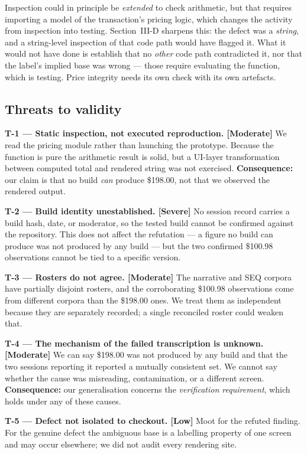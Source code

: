 \documentclass[conference]{IEEEtran}
\begin{document}
Inspection could in principle be \emph{extended} to check arithmetic, but that requires importing a
model of the transaction's pricing logic, which changes the activity from inspection into testing.
Section~III-D sharpens this: the defect was a \emph{string}, and a string-level inspection of that code
path would have flagged it. What it would not have done is establish that no \emph{other} code path
contradicted it, nor that the label's implied base was wrong --- those require evaluating the function,
which is testing. Price integrity needs its own check with its own artefacts.

\subsection{Threats to validity}

\textbf{T-1 --- Static inspection, not executed reproduction. [Moderate]} We read the pricing module
rather than launching the prototype. Because the function is pure the arithmetic result is solid, but a
UI-layer transformation between computed total and rendered string was not exercised.
\textbf{Consequence:} our claim is that no build \emph{can} produce \$198.00, not that we observed the
rendered output.

\textbf{T-2 --- Build identity unestablished. [Severe]} No session record carries a build hash, date, or
moderator, so the tested build cannot be confirmed against the repository. This does not affect the
refutation --- a figure no build can produce was not produced by any build --- but the two confirmed
\$100.98 observations cannot be tied to a specific version.

\textbf{T-3 --- Rosters do not agree. [Moderate]} The narrative and SEQ corpora have partially disjoint
rosters, and the corroborating \$100.98 observations come from different corpora than the \$198.00 ones.
We treat them as independent because they are separately recorded; a single reconciled roster could
weaken that.

\textbf{T-4 --- The mechanism of the failed transcription is unknown. [Moderate]} We can say \$198.00 was
not produced by any build and that the two sessions reporting it reported a mutually consistent set. We
cannot say whether the cause was misreading, contamination, or a different screen.
\textbf{Consequence:} our generalisation concerns the \emph{verification requirement}, which holds under
any of these causes.

\textbf{T-5 --- Defect not isolated to checkout. [Low]} Moot for the refuted finding. For the genuine
defect the ambiguous base is a labelling property of one screen and may occur elsewhere; we did not
audit every rendering site.
\end{document}
